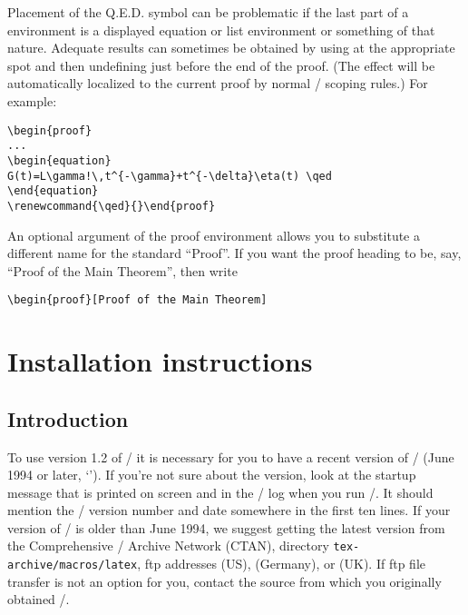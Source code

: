 \documentclass[leqno,titlepage,openany]{amsldoc}
\newcommand{\ii}[1]{#1\index{#1}}
\newcommand{\chapnum}[1]{---#1---}
\newcommand{\nfn}[1]{\texttt{#1}}
\newcommand{\rhcn}{}%
\begin{document}
Placement of the Q.E.D. symbol can be problematic if the last part of
a  environment is a displayed equation or list environment
or something of that nature. Adequate results can sometimes be
obtained by using  at the appropriate spot and then undefining
 just before the end of the proof.  (The effect will be
automatically localized to the current proof by normal \latex/ scoping
rules.)  For example:
\begin{verbatim}
\begin{proof}
...
\begin{equation}
G(t)=L\gamma!\,t^{-\gamma}+t^{-\delta}\eta(t) \qed
\end{equation}
\renewcommand{\qed}{}\end{proof}
\end{verbatim}

An optional argument of the proof environment allows you to substitute
a different name for the standard ``Proof''. If you want
the proof heading to be, say, ``Proof of the Main Theorem'', then write
\begin{verbatim}
\begin{proof}[Proof of the Main Theorem]
\end{verbatim}

\clearpage
\appendix
\renewcommand{\chapnum}[1]{---Appendix\ #1---}
\renewcommand{\rhcn}{Appendix \thechapter. }

\chapter{Installation instructions}\label{install}

\section{Introduction}\label{ctan}

To use version 1.2 of \amslatex/ it is necessary for you to have a
recent version of \latex/ (June 1994 or later, `\LaTeXe'). If you're not
sure about the version, look at the startup message that is printed on
screen and in the \tex/ log when you run \latex/. It should mention the
\latex/ version number and date somewhere in the first ten lines. If
your version of \latex/ is older than June 1994, we suggest getting the
latest version from the Comprehensive \tex/ Archive
Network
(\ii{CTAN}), directory \nfn{tex-archive/macros/latex}, ftp addresses
 (US),  (Germany), or
 (UK). If ftp file transfer is not an option for you,
contact the source from which you originally obtained \latex/.
\end{document}
